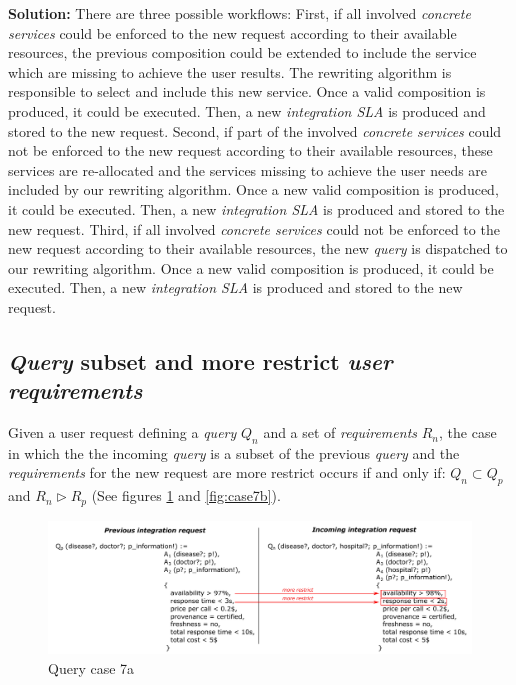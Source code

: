 \bigskip
\noindent \textbf{Solution:} There are three possible workflows: First, if all involved \textsl{concrete services} could be enforced to the new request according to their available resources, the previous composition could be extended to include the service which are missing to achieve the user results. The rewriting algorithm is responsible to select and include this new service. Once a valid composition is produced, it could be executed. Then, a new \textsl{integration SLA} is produced and stored to the new request. Second, if part of the involved \textsl{concrete services} could not be enforced to the new request according to their available resources, these services are re-allocated and the services missing to achieve the user needs are included by our rewriting algorithm. Once a new valid composition is produced, it  could be executed. Then, a new \textsl{integration SLA} is produced and stored to the new request. Third, if all involved \textsl{concrete services} could not be enforced to the new request according to their available resources, the new \textsl{query} is dispatched to our rewriting algorithm. Once a new valid composition is produced, it could be executed. Then, a new \textsl{integration SLA} is produced and stored to the new request.

\subsection{\textsl{Query} subset and more restrict \textsl{user requirements}}
Given a user request defining a \textsl{query} $Q_{n}$ and a set of \textsl{requirements} $R_{n}$, the case in which the the incoming \textsl{query} is a subset of the previous \textsl{query} and the \textsl{requirements} for the new request are more restrict occurs if and only if: $Q_{n} \subset Q_{p}$ and $R_{n} \triangleright R_{p}$ (See figures \ref{fig:case7a} and \ref{fig:case7b}).

\begin{figure}[h!]
\center
\includegraphics[scale=0.85]{figures/query-case-7a.pdf}\caption{Query case 7a} \label{fig:case7a}
\end{figure}

